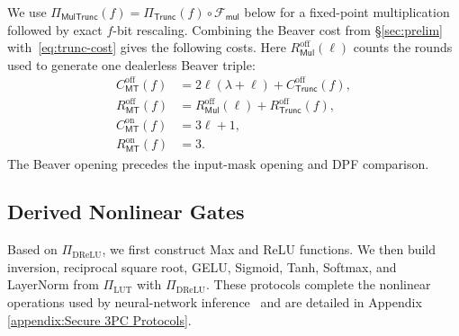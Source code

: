 \documentclass[journal]{IEEEtran}
\theoremstyle{definition}
\theoremstyle{plain}
\newcommand{\Fmul}{\mathcal{F}_{\mathsf{mul}}}
\newcommand{\Trunc}{\Pi_{\mathsf{Trunc}}}
\newcommand{\MulTr}{\Pi_{\mathsf{MulTrunc}}}
\begin{document}
We use $\MulTr(f)=\Trunc(f)\circ\Fmul$ below for a fixed-point
multiplication followed by exact $f$-bit rescaling. Combining the Beaver cost
from \S\ref{sec:prelim} with~\eqref{eq:trunc-cost} gives the following costs.
Here $R^{\mathrm{off}}_{\mathsf{Mul}}(\ell)$ counts the rounds used to generate
one dealerless Beaver triple:
\begin{equation}
\begin{aligned}
C^{\mathrm{off}}_{\mathsf{MT}}(f)
 &=2\ell(\lambda+\ell)+C^{\mathrm{off}}_{\mathsf{Trunc}}(f),\\
R^{\mathrm{off}}_{\mathsf{MT}}(f)
 &=R^{\mathrm{off}}_{\mathsf{Mul}}(\ell)
   +R^{\mathrm{off}}_{\mathsf{Trunc}}(f),\\
C^{\mathrm{on}}_{\mathsf{MT}}(f)
 &=3\ell+1,\\
R^{\mathrm{on}}_{\mathsf{MT}}(f)
 &=3.
\end{aligned}
\label{eq:multr-cost}
\end{equation}
The Beaver opening precedes the input-mask opening and DPF comparison.

\subsection{Derived Nonlinear Gates}\label{sec:derived}
Based on $\Pi_{\text{DReLU}}$, we first construct Max and ReLU functions.
We then build inversion, reciprocal square root, GELU, Sigmoid, Tanh, Softmax,
and LayerNorm from $\Pi_{\text{LUT}}$ with $\Pi_{\text{DReLU}}$.
These protocols complete the nonlinear operations used by neural-network inference~\cite{cryptflow2,sigma,falcon}
and are detailed in Appendix \ref{appendix:Secure 3PC Protocols}. 
\end{document}
